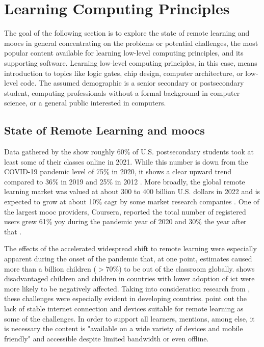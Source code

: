 \section{Learning Computing Principles}

The goal of the following section is to explore the state of remote learning and \glspl{mooc} in general concentrating on the problems or potential challenges, the most popular content available for learning low-level computing principles, and its supporting software.
Learning low-level computing principles, in this case, means introduction to topics like logic gates, chip design, computer architecture, or low-level code.
The assumed demographic is a senior secondary or postsecondary student, computing professionals without a formal background in computer science, or a general public interested in computers.

\subsection{State of Remote Learning and \glspl{mooc}}
\label{sec:learning-state}

Data gathered by the \textcite{us_doe_digest_2021} show roughly 60\% of U.S. postsecondary students took at least some of their classes online in 2021.
While this number is down from the COVID-19 pandemic level of 75\% in 2020, it shows a clear upward trend compared to 36\% in 2019 and 25\% in 2012 \parencite{us_doe_digest_2021}.
More broadly, the global remote learning market was valued at about 300 to 400 billion U.S. dollars in 2022 and is expected to grow at about 10\% \gls{cagr} by some market research companies \parencites{GlobalElearning_GIA_2023}{GlobalElearning_GMI_2023}.
One of the largest \gls{mooc} providers, Coursera, reported the total number of registered users grew 61\% \gls{yoy} during the pandemic year of 2020 and 30\% the year after that \parencite{Coursera_Impact_2021}.

The effects of the accelerated widespread shift to remote learning were especially apparent during the onset of the pandemic that, at one point, \textcite{UNESCO_2022} estimates caused more than a billion children ($>70\%$) to be out of the classroom globally.
\textcite{eu_covid_learning_2023} shows disadvantaged children and children in countries with lower adoption of \gls{ict} were more likely to be negatively affected.
Taking into consideration research from \textcite{tadesse_impact_2020}, these challenges were especially evident in developing countries.
\textcite{tadesse_impact_2020} point out the lack of stable internet connection and devices suitable for remote learning as some of the challenges.
In order to support all learners, \textcite{Ali_2020} mentions, among else, it is necessary the content is "available on a wide variety of devices and mobile friendly" and accessible despite limited bandwidth or even offline.

